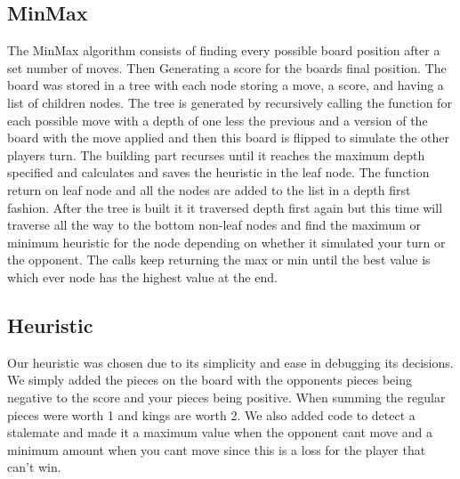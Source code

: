 \documentclass[12pt]{article}
\begin{document}
	\subsection{MinMax}
        The MinMax algorithm consists of finding every possible board position after a set number of moves. Then Generating a score for the boards final position. The board was stored in a tree with each node storing a move, a score, and having a list of children nodes. The tree is generated by recursively calling the function for each possible move with a depth of one less the previous and a version of the board with the move applied and then this board is flipped to simulate the other players turn. The building part recurses until it reaches the maximum depth specified and calculates and saves the heuristic in the leaf node. The function return on leaf node and all the nodes are added to the list in a depth first fashion. After the tree is built it it traversed depth first again but this time will traverse all the way to the bottom non-leaf nodes and find the maximum or minimum heuristic for the node depending on whether it simulated your turn or the opponent. The calls keep returning the max or min until the best value is which ever node has the highest value at the end.
	
	\subsection{Heuristic}
        Our heuristic was chosen due to its simplicity and ease in debugging its decisions. We simply added the pieces on the board with the opponents pieces being negative to the score and your pieces being positive. When summing the regular pieces were worth 1 and kings are worth 2. We also added code to detect a stalemate and made it a maximum value when the opponent cant move and a minimum amount when you cant move since this is a loss for the player that can't win. 
\end{document}
